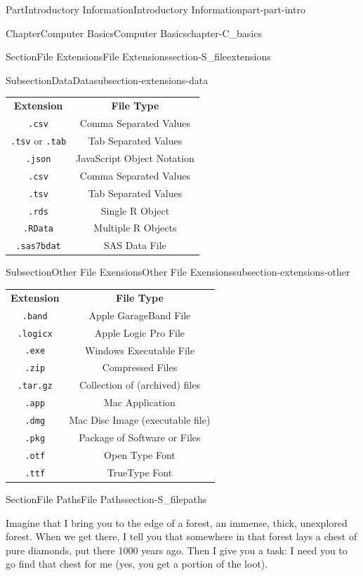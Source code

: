 \documentclass[twoside,10pt,]{book}
\newcommand{\tabularfont}{\relax}
\newcommand{\mono}[1]{\texttt{#1}}
\begin{document}
\begin{partptx}{Part}{Introductory Information}{}{Introductory Information}{}{}{part-part-intro}
\begin{chapterptx}{Chapter}{Computer Basics}{}{Computer Basics}{}{}{chapter-C_basics}
\begin{sectionptx}{Section}{File Extensions}{}{File Extensions}{}{}{section-S_fileextensions}
\begin{subsectionptx}{Subsection}{Data}{}{Data}{}{}{subsection-extensions-data}
\begin{center}%
{\tabularfont%
\begin{tabular}{cc}
{\bfseries{}Extension}&{\bfseries{}File Type}\tabularnewline[0pt]
\mono{.csv}&Comma Separated Values\tabularnewline[0pt]
\mono{.tsv} or \mono{.tab}&Tab Separated Values\tabularnewline[0pt]
\mono{.json}&JavaScript Object Notation\tabularnewline[0pt]
\mono{.csv}&Comma Separated Values\tabularnewline[0pt]
\mono{.tsv}&Tab Separated Values\tabularnewline[0pt]
\mono{.rds}&Single R Object\tabularnewline[0pt]
\mono{.RData}&Multiple R Objects\tabularnewline[0pt]
\mono{.sas7bdat}&SAS Data File
\end{tabular}
}%
\end{center}%
\end{subsectionptx}
%
%
\typeout{************************************************}
\typeout{************************************************}
%
\begin{subsectionptx}{Subsection}{Other File Exensions}{}{Other File Exensions}{}{}{subsection-extensions-other}
%
\begin{center}%
{\tabularfont%
\begin{tabular}{cc}
{\bfseries{}Extension}&{\bfseries{}File Type}\tabularnewline[0pt]
\mono{.band}&Apple GarageBand File\tabularnewline[0pt]
\mono{.logicx}&Apple Logic Pro File\tabularnewline[0pt]
\mono{.exe}&Windows Executable File\tabularnewline[0pt]
\mono{.zip}&Compressed Files\tabularnewline[0pt]
\mono{.tar.gz}&Collection of (archived) files\tabularnewline[0pt]
\mono{.app}&Mac Application\tabularnewline[0pt]
\mono{.dmg}&Mac Disc Image (executable file)\tabularnewline[0pt]
\mono{.pkg}&Package of Software or Files\tabularnewline[0pt]
\mono{.otf}&Open Type Font\tabularnewline[0pt]
\mono{.ttf}&TrueType Font
\end{tabular}
}%
\end{center}%
\end{subsectionptx}
\end{sectionptx}
%
%
\typeout{************************************************}
\typeout{************************************************}
%
\begin{sectionptx}{Section}{File Paths}{}{File Paths}{}{}{section-S_filepaths}
%
%
\begin{introduction}{}%
Imagine that I bring you to the edge of a forest, an immense, thick, unexplored forest. When we get there, I tell you that somewhere in that forest lays a chest of pure diamonds, put there 1000 years ago. Then I give you a task: I need you to go find that chest for me (yes, you get a portion of the loot).%

\end{introduction}
\end{sectionptx}
\end{chapterptx}
\end{partptx}
\end{document}
